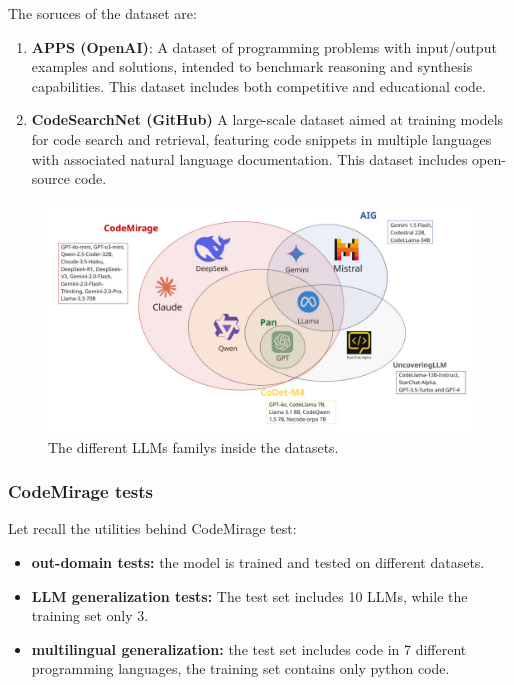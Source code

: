 The soruces of the dataset are:
\begin{enumerate}
    \item \textbf{APPS (OpenAI)}: A dataset of programming 
    problems with input/output examples and solutions, intended to 
    benchmark reasoning and synthesis capabilities. This dataset includes both competitive and educational code.
    \item \textbf{CodeSearchNet (GitHub)} A large-scale dataset aimed at training models for code 
    search and retrieval, featuring code snippets in multiple languages 
    with associated natural language documentation. This dataset includes open-source code.
\end{enumerate}


\begin{figure}[H]
    \centering
    \includegraphics[width=1\textwidth]{img/1/Untitled-7.pdf}
    \caption{The different LLMs familys inside the datasets.}
    \label{fig:LLMOverDataset}
\end{figure}

\clearpage
\subsubsection{CodeMirage tests}

Let recall the utilities behind CodeMirage \cite{guo2025codemirage} test:
\begin{itemize}
\item \textbf{out-domain tests:} the model is trained and tested on different datasets.
\item \textbf{LLM generalization tests:} The test set includes 10 LLMs, while the training set only 3.
\item \textbf{multilingual generalization:} the test set includes code in 7 different programming languages, 
the training set contains only python code.
\end{itemize}




